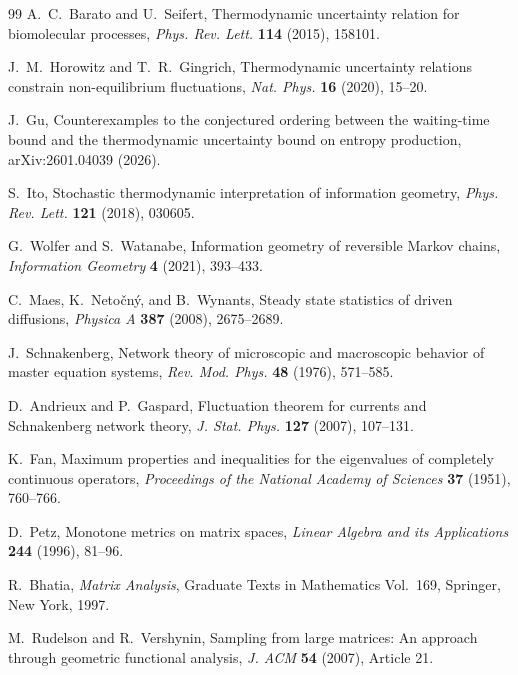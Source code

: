 \documentclass[11pt,a4paper]{article}
\numberwithin{equation}{section}
\theoremstyle{thmcompact}
\theoremstyle{remark}
\begin{document}
\begin{thebibliography}{99}
A.~C.~Barato and U.~Seifert,
\newblock Thermodynamic uncertainty relation for biomolecular processes,
\newblock \emph{Phys. Rev. Lett.} \textbf{114} (2015), 158101.

J.~M.~Horowitz and T.~R.~Gingrich,
\newblock Thermodynamic uncertainty relations constrain non-equilibrium fluctuations,
\newblock \emph{Nat. Phys.} \textbf{16} (2020), 15--20.

J.~Gu,
\newblock Counterexamples to the conjectured ordering between the waiting-time bound and the thermodynamic uncertainty bound on entropy production,
\newblock arXiv:2601.04039 (2026).

S.~Ito,
\newblock Stochastic thermodynamic interpretation of information geometry,
\newblock \emph{Phys. Rev. Lett.} \textbf{121} (2018), 030605.

G.~Wolfer and S.~Watanabe,
\newblock Information geometry of reversible Markov chains,
\newblock \emph{Information Geometry} \textbf{4} (2021), 393--433.

C.~Maes, K.~Neto\v{c}n\'y, and B.~Wynants,
\newblock Steady state statistics of driven diffusions,
\newblock \emph{Physica A} \textbf{387} (2008), 2675--2689.

J.~Schnakenberg,
\newblock Network theory of microscopic and macroscopic behavior of master equation systems,
\newblock \emph{Rev. Mod. Phys.} \textbf{48} (1976), 571--585.

D.~Andrieux and P.~Gaspard,
\newblock Fluctuation theorem for currents and Schnakenberg network theory,
\newblock \emph{J. Stat. Phys.} \textbf{127} (2007), 107--131.

K.~Fan,
\newblock Maximum properties and inequalities for the eigenvalues of completely continuous operators,
\newblock \emph{Proceedings of the National Academy of Sciences} \textbf{37} (1951), 760--766.

D.~Petz,
\newblock Monotone metrics on matrix spaces,
\newblock \emph{Linear Algebra and its Applications} \textbf{244} (1996), 81--96.

R.~Bhatia,
\newblock \textit{Matrix Analysis},
\newblock Graduate Texts in Mathematics Vol.~169, Springer, New York, 1997.

M.~Rudelson and R.~Vershynin,
\newblock Sampling from large matrices: An approach through geometric functional analysis,
\newblock \emph{J. ACM} \textbf{54} (2007), Article 21.


\end{thebibliography}
\end{document}
